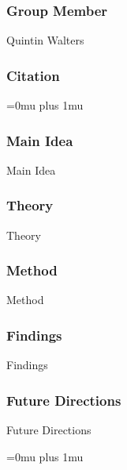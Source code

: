 \subsubsection{Group Member}

\noindent
Quintin Walters

\noindent
\subsubsection{Citation}

\Urlmuskip=0mu plus 1mu\relax

\subsubsection{Main Idea}

\noindent
Main Idea

\subsubsection{Theory}

\noindent
Theory

\subsubsection{Method}

\noindent
Method

\subsubsection{Findings}

\noindent
Findings

\subsubsection{Future Directions}

\noindent
Future Directions 

\Urlmuskip=0mu plus 1mu\relax
\pagebreak
